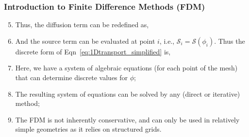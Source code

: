 \documentclass[10pt,compress,unknownkeysallowed]{beamer}
\begin{document}
\begin{frame}
  \frametitle{Introduction to Finite Difference Methods (FDM)}
\begin{enumerate}
   \setcounter{enumi}{4}
  \item <1-> Thus, the diffusion term can be redefined as,
  \item <2-> And the source term can be evaluated at point $i$, i.e., $\mathcal{S}_{i}=\mathcal{S}\left(\phi_{i}\right)$. Thus the discrete form of Eqn~\ref{eq:1Dtransport_simplified} is,
  \item <3-> Here, we have a system of algebraic equations (for each point of the mesh) that can determine discrete values for $\phi$;
  \item <4-> The resulting system of equations can be solved by any (direct or iterative) method;
  \item <5-> The FDM is not inherently conservative, and can only be used in relatively simple geometries as it relies on structured grids.
\end{enumerate}  
 
\end{frame}
\end{document}
